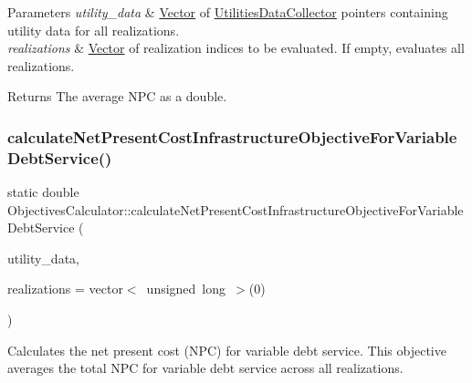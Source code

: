 \begin{DoxyParams}{Parameters}
{\em utility\+\_\+data} & \mbox{\hyperlink{classVector}{Vector}} of {\ttfamily \mbox{\hyperlink{classUtilitiesDataCollector}{Utilities\+Data\+Collector}}} pointers containing utility data for all realizations. \\
\hline
{\em realizations} & \mbox{\hyperlink{classVector}{Vector}} of realization indices to be evaluated. If empty, evaluates all realizations. \\
\hline
\end{DoxyParams}
\begin{DoxyReturn}{Returns}
The average N\+PC as a double. 
\end{DoxyReturn}
\mbox{\label{classObjectivesCalculator_aaf6480a2839ed67c9d5dd52d79e2954d}} 
\subsubsection{\texorpdfstring{calculate\+Net\+Present\+Cost\+Infrastructure\+Objective\+For\+Variable\+Debt\+Service()}{calculateNetPresentCostInfrastructureObjectiveForVariableDebtService()}}
{\footnotesize\ttfamily static double Objectives\+Calculator\+::calculate\+Net\+Present\+Cost\+Infrastructure\+Objective\+For\+Variable\+Debt\+Service (\begin{DoxyParamCaption}\item[{const vector$<$ \mbox{\hyperlink{classUtilitiesDataCollector}{Utilities\+Data\+Collector}} $\ast$$>$ \&}]{utility\+\_\+data,  }\item[{vector$<$ unsigned long $>$}]{realizations = {\ttfamily vector$<$~unsigned~long~$>$(0)} }\end{DoxyParamCaption})\hspace{0.3cm}{\ttfamily [static]}}



Calculates the net present cost (N\+PC) for variable debt service. This objective averages the total N\+PC for variable debt service across all realizations. 


